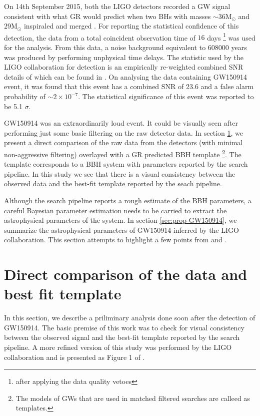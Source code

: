 \newcommand{\Msun}{\ensuremath{\mathrm{M}_\odot}}

On 14th September 2015, both the LIGO detectors recorded a GW signal consistent with what GR would predict when two BHs with masses $\sim 36 \Msun$ and $29 \Msun$ inspiraled and merged \cite{gw150914detection}. For reporting the statistical confidence of this detection, the data from a total coincident observation time of $16$ days \footnote{after applying the data quality vetoes}  was used for the analysis. From this data, a noise background equivalent to 608000 years was produced by performing unphysical time delays. The statistic used by the LIGO collaboration for detection is an empirically re-weighted combined SNR details of which can be found in \cite{detectionStat1}. On analysing the data containing GW150914 event, it was found that this event has a combined SNR of 23.6 and a false alarm probability of $\sim 2 \times 10^{-7}$. The statistical significance of this event was reported to be 5.1 $\sigma$. 

GW150914 was an extraordinarily loud event. It could be visually seen after performing just some basic filtering on the raw detector data. In section \ref{sec:dirrect-comparision}, we present a direct comparison of the raw data from the detectors (with minimal non-aggressive filtering) overlayed with a GR predicted BBH template \footnote{The models of GWs that are used in matched filtered searches are calleed as templates.}. The template corresponds to a BBH system with parameters reported by the search pipeline. In this study we see that there is a visual consistency between the observed data and the best-fit template reported by the seach pipeline. 

Although the search pipeline reports a rough estimate of the BBH parameters, a careful Bayesian parameter estimation needs to be carried to extract the astrophysical parameters of the system. In section \ref{sec:prop-GW150914}, we summarize the astrophysical parameters of GW150914 inferred by the LIGO collaboration. This section attempts to highlight a few points from \cite{gw150914PE} and \cite{gw150914PEseobnrv3}.  

\section{Direct comparison of the data and best fit template}
\label{sec:dirrect-comparision}
In this section, we describe a priliminary analysis done soon after the detection of GW150914. The basic premise of this work was to check for visual consistency between the observed signal and the best-fit template reported by the search pipeline. A more refined version of this study was performed by the LIGO collaboration and is presented as Figure 1 of \cite{gw150914detection}. 

